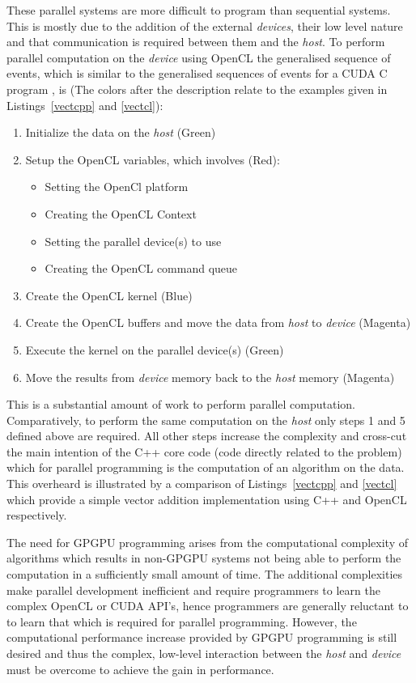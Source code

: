 \documentclass{sig-alternate-05-2015}
\begin{document}
These parallel systems are more difficult to program than sequential 
systems. This is mostly due to the addition of the external \textit{devices}, 
their low level nature and that communication is required between them and the
\textit{host}. To perform parallel computation on the \textit{device} using OpenCL 
the generalised sequence of events, which is similar to the generalised sequences 
of events for a CUDA C program \cite{harris:cuda}, is (The colors after the 
description relate to the examples given in Listings~\ref{vectcpp} and
\ref{vectcl}):
\begin{enumerate}
	\item{Initialize the data on the \textit{host} (Green)}
	\item{Setup the OpenCL variables, which involves (Red):
			\begin{itemize}
				\item{Setting the OpenCl platform }
				\item{Creating the OpenCL Context }
				\item{Setting the parallel device(s) to use }
				\item{Creating the OpenCL command queue }
		\end{itemize} }
	\item{Create the OpenCL kernel (Blue)}
	\item{Create the OpenCL buffers and move the data from \textit{host} to
		\textit{device} (Magenta)}
	\item{Execute the kernel on the parallel device(s) (Green)}
	\item{Move the results from \textit{device} memory back to the \textit{host}
		memory (Magenta)}
\end{enumerate}

This is a substantial amount of work to perform parallel computation.
Comparatively, to perform the same computation on the \textit{host} only 
steps 1 and 5 defined above are required. All other steps increase
the complexity and cross-cut the main intention of
the C++ core code (code directly related to the problem) which for parallel
programming is the computation of an algorithm on the data. This overheard is 
illustrated by a comparison of Listings~\ref{vectcpp} and \ref{vectcl} which 
provide a simple vector addition implementation using C++ and OpenCL respectively.

The need for GPGPU programming arises from the computational complexity of
algorithms which results in non-GPGPU systems not being able to perform the
computation in a sufficiently small amount of time. The additional complexities
make parallel development inefficient and require programmers to learn the complex 
OpenCL or CUDA API's, hence programmers are generally reluctant to to learn that 
which is required for parallel programming. However, the computational
performance increase
provided by GPGPU programming is still desired and thus the complex, low-level
interaction between the \textit{host} and \textit{device} must be overcome to
achieve the gain in performance.
\end{document}
